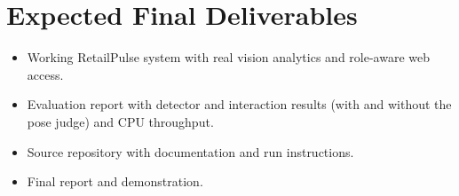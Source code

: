 \section{Expected Final Deliverables}
\begin{itemize}
\item Working RetailPulse system with real vision analytics and role-aware web access.
\item Evaluation report with detector and interaction results (with and without the pose judge) and CPU throughput.
\item Source repository with documentation and run instructions.
\item Final report and demonstration.
\end{itemize}

